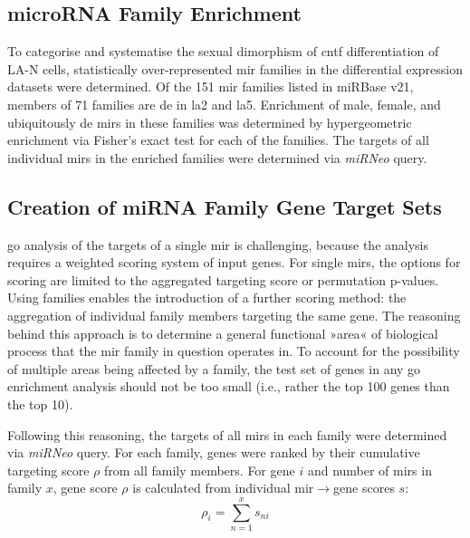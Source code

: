 \begin{method}

\subsection{microRNA Family Enrichment}
To categorise and systematise the sexual dimorphism of \ac{cntf} differentiation of LA-N cells, statistically over-represented \ac{mir} families in the differential expression datasets were determined. Of the 151 \ac{mir} families listed in miRBase v21, members of 71 families are \ac{de} in \ac{la2} and \ac{la5}. Enrichment of male, female, and ubiquitously \ac{de} \acp{mir} in these families was determined by hypergeometric enrichment via Fisher's exact test for each of the families. The targets of all individual \acp{mir} in the enriched families were determined via \textit{miRNeo} query. 

\subsection{Creation of miRNA Family Gene Target Sets}
\ac{go} analysis of the targets of a single \ac{mir} is challenging, because the analysis requires a weighted scoring system of input genes. For single \acp{mir}, the options for scoring are limited to the aggregated targeting score or permutation p-values. Using families enables the introduction of a further scoring method: the aggregation of individual family members targeting the same gene. The reasoning behind this approach is to determine a general functional »area« of biological process that the \ac{mir} family in question operates in. To account for the possibility of multiple areas being affected by a family, the test set of genes in any \ac{go} enrichment analysis should not be too small (i.e., rather the top 100 genes than the top 10). 

Following this reasoning, the targets of all \acp{mir} in each family were determined via \textit{miRNeo} query. For each family, genes were ranked by their cumulative targeting score $\rho$ from all family members. For gene $i$ and number of \acp{mir} in family $x$, gene score $\rho$ is calculated from individual \ac{mir}$\to$gene scores $s$: $$\rho_{i} = \sum_{n=1}^{x} s_{ni}$$


\end{method}
